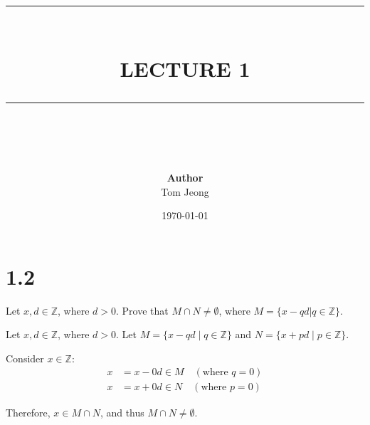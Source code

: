 \documentclass{article}
\newcommand{\HRule}[1]{\rule{\linewidth}{#1}}
\begin{document}

\title{ \normalsize \textsc{}
		\\ [2.0cm]
		\HRule{1.5pt} \\
		\LARGE \textbf{\uppercase{Lecture 1 }}
		\HRule{2.0pt} \\ [0.6cm] \LARGE{}
		}

\date{\today}
\author{\textbf{Author} \\ 
		Tom Jeong
        }



\section{1.2}
Let $x, d \in \mathbb{Z} $, where $d > 0$. Prove that $M \cap N \neq \emptyset$, where $M = \{x - qd | q \in \mathbb{Z}\}$.
\begin{solution}
    Let $x, d \in \mathbb{Z}$, where $d > 0$. 
Let $M = \{x - qd \mid q \in \mathbb{Z}\}$ and $N = \{x + pd \mid p \in \mathbb{Z}\}$.

Consider $x \in \mathbb{Z}$:
\begin{align*}
x &= x - 0d \in M \quad (\text{where } q = 0) \\
x &= x + 0d \in N \quad (\text{where } p = 0)
\end{align*}

Therefore, $x \in M \cap N$, and thus $M \cap N \neq \emptyset$.
\end{solution}
\end{document}
